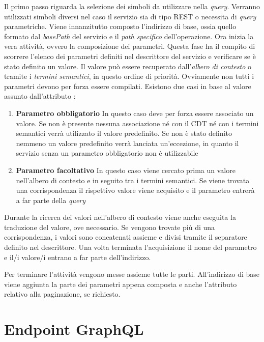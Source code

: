 Il primo passo riguarda la selezione dei simboli da utilizzare nella \emph{query}. Verranno utilizzati simboli diversi nel caso il servizio sia di tipo REST o necessita di \emph{query} parametriche. Viene innanzitutto composto l'indirizzo di base, ossia quello formato dal \emph{basePath} del servizio e il \emph{path specifico} dell'operazione. Ora inizia la vera attività, ovvero la composizione dei parametri. Questa fase ha il compito di scorrere l'elenco dei parametri definiti nel descrittore del servizio e verificare se è stato definito un valore. Il valore può essere recuperato dall'\emph{albero di contesto} o tramite i \emph{termini semantici}, in questo ordine di priorità. Ovviamente non tutti i parametri devono per forza essere compilati. Esistono due casi in base al valore assunto dall'attributo :

\begin{enumerate}
	\item \textbf{Parametro obbligatorio}
	In questo caso deve per forza essere associato un valore. Se non è presente nessuna associazione né con il CDT né con i termini semantici verrà utilizzato il valore predefinito. Se non è stato definito nemmeno un valore predefinito verrà lanciata un'eccezione, in quanto il servizio senza un parametro obbligatorio non è utilizzabile
	\item \textbf{Parametro facoltativo}
	In questo caso viene cercato prima un valore nell'al\-be\-ro di contesto e in seguito tra i termini semantici. Se viene trovata una corrispondenza il rispettivo valore viene acquisito e il parametro entrerà a far parte della \emph{query}
\end{enumerate}

Durante la ricerca dei valori nell'albero di contesto viene anche eseguita la traduzione del valore, ove necessario. Se vengono trovate più di una corrispondenza, i valori sono concatenati assieme e divisi tramite il separatore definito nel descrittore. Una volta terminata l'acquisizione il nome del parametro e il/i valore/i entrano a far parte dell'indirizzo.

Per terminare l'attività vengono messe assieme tutte le parti. All'indirizzo di base viene aggiunta la parte dei parametri appena composta e anche l'attributo relativo alla paginazione, se richiesto.

\section{Endpoint GraphQL\label{sec:endpoint-graphql}}

